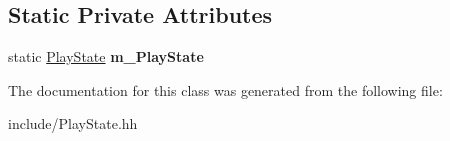 \subsection*{Static Private Attributes}
\begin{DoxyCompactItemize}
\item 
\hypertarget{class_play_state_a911bd5c25e277094bf8ec43b72116112}{}static \hyperlink{class_play_state}{Play\+State} {\bfseries m\+\_\+\+Play\+State}\label{class_play_state_a911bd5c25e277094bf8ec43b72116112}

\end{DoxyCompactItemize}


The documentation for this class was generated from the following file\+:\begin{DoxyCompactItemize}
\item 
include/Play\+State.\+hh\end{DoxyCompactItemize}
